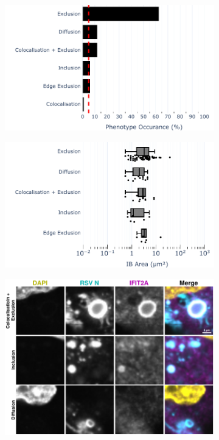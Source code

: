 \begin{figure}
    \begin{subfigure}{0.5\textwidth}
        \caption{}
        \includegraphics[width=1\linewidth]{10. Chapter 5/Figs/01. Infection/01. IFIT2A/10. bar_i2a_beas2b.pdf} 
    \end{subfigure}
    \begin{subfigure}{0.5\textwidth}
        \caption{}
        \includegraphics[width=1\linewidth]{10. Chapter 5/Figs/01. Infection/01. IFIT2A/11. box_i2a_beas2b.pdf}
    \end{subfigure}
    \begin{subfigure}{1\textwidth}
        \caption{}
        \includegraphics[width=1\linewidth]{10. Chapter 5/Figs/01. Infection/01. IFIT2A/12. i2a beas2b.pdf} 

\end{subfigure}
\end{figure}

